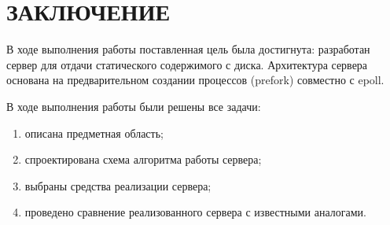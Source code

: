 \chapter*{ЗАКЛЮЧЕНИЕ}

В ходе выполнения работы поставленная цель была достигнута: 
разработан сервер для отдачи статического содержимого с диска.
Архитектура сервера основана на предварительном создании процессов (prefork) совместно с epoll.

В ходе выполнения работы были решены все задачи: 
\begin{enumerate}[leftmargin=1.6\parindent]
	\item описана предметная область;
	\item спроектирована схема алгоритма работы сервера;
	\item выбраны средства реализации сервера;
	\item проведено сравнение реализованного сервера с известными аналогами.
\end{enumerate}